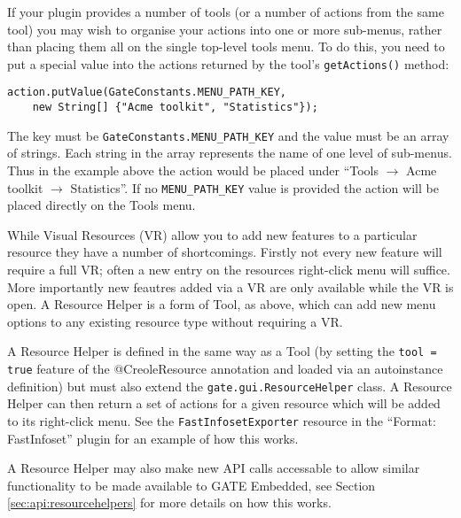 
If your plugin provides a number of tools (or a number of actions from the same
tool) you may wish to organise your actions into one or more sub-menus, rather
than placing them all on the single top-level tools menu.  To do this, you need
to put a special value into the actions returned by the tool's
\lstinline!getActions()! method:
\begin{lstlisting}
action.putValue(GateConstants.MENU_PATH_KEY,
    new String[] {"Acme toolkit", "Statistics"});
\end{lstlisting}
The key must be \lstinline!GateConstants.MENU_PATH_KEY! and the value must be
an array of strings.  Each string in the array represents the name of one level
of sub-menus.  Thus in the example above the action would be placed under
``Tools $\rightarrow$ Acme toolkit $\rightarrow$ Statistics''.  If no
\lstinline!MENU_PATH_KEY! value is provided the action will be placed directly
on the Tools menu.


While Visual Resources (VR) allow you to add new features to a particular
resource they have a number of shortcomings. Firstly not every new feature
will require a full VR; often a new entry on the resources right-click
menu will suffice. More importantly new feautres added via a VR are only
available while the VR is open. A Resource Helper is a form of Tool, as
above, which can add new menu options to any existing resource type without
requiring a VR.

A Resource Helper is defined in the same way as a Tool (by setting the
\verb|tool = true| feature of the @CreoleResource annotation and loaded via an
autoinstance definition) but must also extend the \verb|gate.gui.ResourceHelper|
class. A Resource Helper can then return a set of actions for a given resource
which will be added to its right-click menu. See the \verb|FastInfosetExporter|
resource in the ``Format: FastInfoset'' plugin for an example of how this works.

A Resource Helper may also make new API calls accessable to allow similar
functionality to be made available to GATE Embedded, see Section
\ref{sec:api:resourcehelpers} for more details on how this works.
